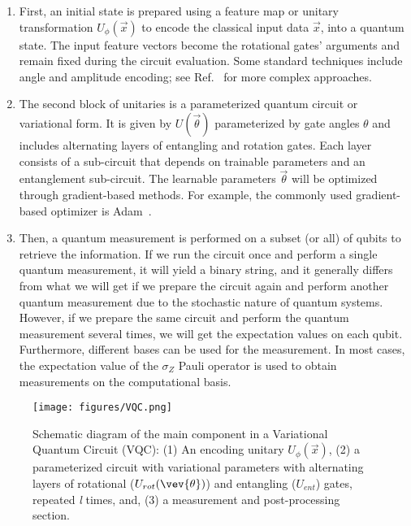 \begin{enumerate}
    \item First, an initial state is prepared using a feature map or unitary transformation $U_{\phi}(\vec{x})$ to encode the classical input data $\vec{x}$, into a quantum state.
    The input feature vectors become the rotational gates' arguments and remain fixed during the circuit evaluation.
    Some standard techniques include angle and amplitude encoding; see Ref.~\cite{jlazar2021} for more complex approaches.
    \item The second block of unitaries is a parameterized quantum circuit or variational form.
    It is given by $U(\vec{\theta})$ parameterized by gate angles $\theta$ and includes alternating layers of entangling and rotation gates.
    Each layer consists of a sub-circuit that depends on trainable parameters and an entanglement sub-circuit.
    The learnable parameters $\vec{\theta}$ will be optimized through gradient-based methods. For example, the commonly used gradient-based optimizer is Adam~\cite{adam_opt}.
    \item Then, a quantum measurement is performed on a subset (or all) of qubits to retrieve the information.
    If we run the circuit once and perform a single quantum measurement, it will yield a binary string, and it generally differs from what we will get if we prepare the circuit again and perform another quantum measurement due to the stochastic nature of quantum systems.
    However, if we prepare the same circuit and perform the quantum measurement several times, we will get the expectation values on each qubit.
    Furthermore, different bases can be used for the measurement.
    In most cases, the expectation value of the $\sigma_Z$ Pauli operator is used to obtain measurements on the computational basis.
\end{enumerate}

\begin{figure}
    \centering
    \texttt{[image: figures/VQC.png]}
    \caption{Schematic diagram of the main component in a Variational Quantum Circuit (VQC): (1) An encoding unitary $U_{\phi}(\vec{x})$, (2) a parameterized circuit with variational parameters with alternating layers of rotational ($U_{rot}(\vev{\theta})$) and entangling ($U_{ent}$) gates, repeated \emph{l} times, and, (3) a measurement and post-processing section.}
    \label{fig:vqc_circuit}
\end{figure}


